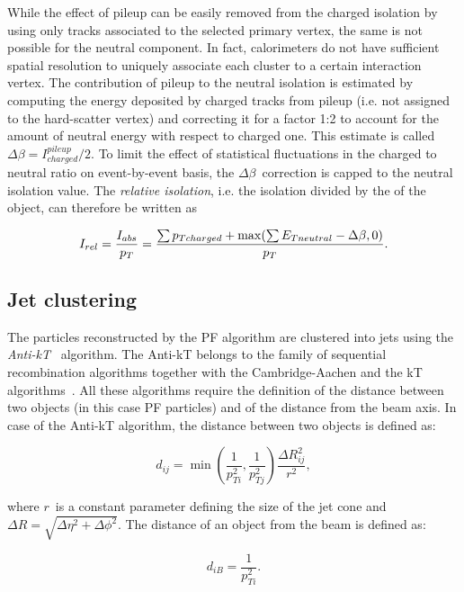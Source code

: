 While the effect of pileup can be easily removed from the charged isolation by using only tracks associated to the selected primary vertex, the same is not possible for the neutral component. In fact, calorimeters do not have sufficient spatial resolution to uniquely associate each cluster to a certain interaction vertex. The contribution of pileup to the neutral isolation is estimated by computing the energy deposited by charged tracks from pileup (i.e. not assigned to the hard-scatter vertex) and correcting it for a factor 1:2 to account for the amount of neutral energy with respect to charged one. This estimate is called \emph{$\Delta\beta = I^{pileup}_{charged}/2$}. To limit the effect of statistical fluctuations in the charged to neutral ratio on event-by-event basis, the $\Delta\beta$\ correction is capped to the neutral isolation value. The \emph{relative isolation}, i.e. the isolation divided by the \pT of the object, can therefore be written as

\begin{equation}
I_{rel} = \dfrac{I_{abs}}{p_{T}} =  \dfrac{\sum{p_{T charged}} + \operatorname{max}(\sum{E_{T neutral}} - \Delta \beta, 0)}{p_T}.
\label{eq:db_rel_iso}
\end{equation}

\subsection{Jet clustering}

The particles reconstructed by the PF algorithm are clustered into jets using the \emph{Anti-kT}~\cite{Cacciari:2008gp} algorithm. The Anti-kT belongs to the family of sequential recombination algorithms together with the Cambridge-Aachen and the kT algorithms~\cite{Ellis:1993tq,Dokshitzer:1997in}. All these algorithms require the definition of the distance between two objects (in this case PF particles) and of the distance from the beam axis. In case of the Anti-kT algorithm, the distance between two objects is defined as:

\begin{equation}
d_{ij} = \operatorname{min}(\dfrac{1}{p_{Ti}^2},\dfrac{1}{p_{Tj}^2})\dfrac{\Delta R_{ij}^2}{r^2},
\end{equation}

where $r$\ is a constant parameter defining the size of the jet cone and $\Delta R = \sqrt{\Delta \eta^2 + \Delta \phi^2}$.
The distance of an object from  the beam is defined as:

\begin{equation}
d_{iB} = \dfrac{1}{p_{Ti}^2}.
\end{equation}

